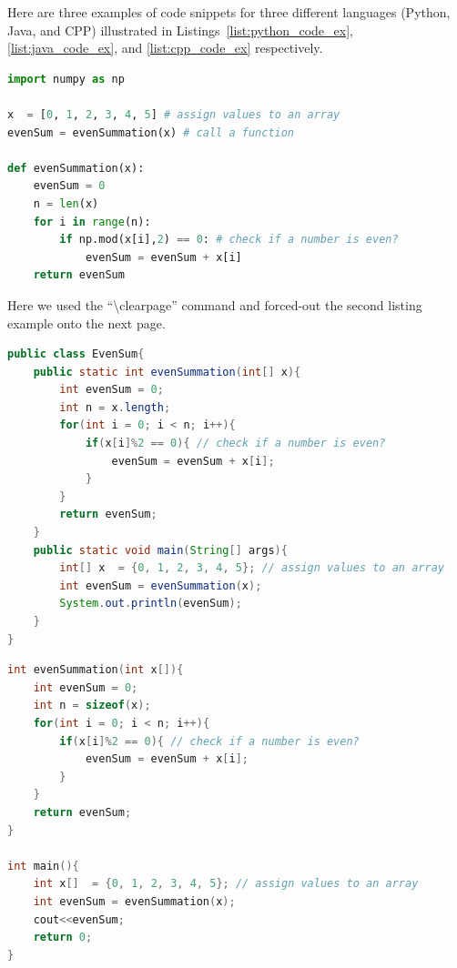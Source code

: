 Here are three examples of code snippets for three different languages (Python, Java, and CPP) illustrated in Listings~\ref{list:python_code_ex}, \ref{list:java_code_ex}, and \ref{list:cpp_code_ex} respectively.  

\begin{lstlisting}[language=Python, caption={Code snippet in \LaTeX ~and  this is a Python code example}, label=list:python_code_ex]
import numpy as np

x  = [0, 1, 2, 3, 4, 5] # assign values to an array
evenSum = evenSummation(x) # call a function

def evenSummation(x):
    evenSum = 0
    n = len(x)
    for i in range(n):
        if np.mod(x[i],2) == 0: # check if a number is even?
            evenSum = evenSum + x[i]
    return evenSum
\end{lstlisting}

Here we used  the ``\textbackslash clearpage'' command and forced-out the second listing example onto the next page. 
\clearpage  %
\begin{lstlisting}[language=Java, caption={Code snippet in \LaTeX ~and  this is a Java code example}, label=list:java_code_ex]
public class EvenSum{ 
    public static int evenSummation(int[] x){
        int evenSum = 0;
        int n = x.length;
        for(int i = 0; i < n; i++){
            if(x[i]%2 == 0){ // check if a number is even?
                evenSum = evenSum + x[i];
            }
        }
        return evenSum;     
    }
    public static void main(String[] args){ 
        int[] x  = {0, 1, 2, 3, 4, 5}; // assign values to an array
        int evenSum = evenSummation(x);
        System.out.println(evenSum);
    } 
} 
\end{lstlisting}


\begin{lstlisting}[language=C, caption={Code snippet in \LaTeX ~and  this is a C/C++ code example}, label=list:cpp_code_ex]
int evenSummation(int x[]){
    int evenSum = 0;
    int n = sizeof(x);
    for(int i = 0; i < n; i++){
        if(x[i]%2 == 0){ // check if a number is even?
            evenSum = evenSum + x[i];
    	}
    }
    return evenSum;     
}

int main(){
    int x[]  = {0, 1, 2, 3, 4, 5}; // assign values to an array
    int evenSum = evenSummation(x);
    cout<<evenSum;
    return 0;
}
\end{lstlisting}
